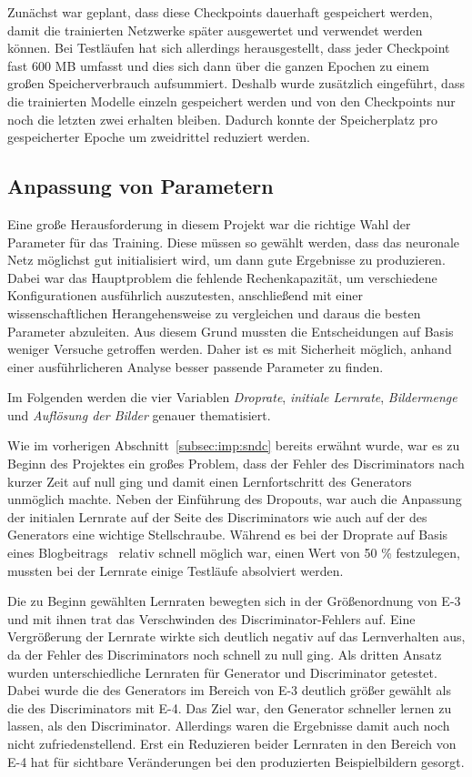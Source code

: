 Zunächst war geplant, dass diese Checkpoints dauerhaft gespeichert werden,
 damit die trainierten Netzwerke später ausgewertet und verwendet werden können.
 Bei Testläufen hat sich allerdings herausgestellt, dass jeder Checkpoint fast
 600 MB umfasst und dies sich dann über die ganzen Epochen zu einem großen
 Speicherverbrauch aufsummiert. Deshalb wurde zusätzlich eingeführt, dass die
 trainierten Modelle einzeln gespeichert werden und von den Checkpoints nur noch
 die letzten zwei erhalten bleiben. Dadurch konnte der Speicherplatz pro
 gespeicherter Epoche um zweidrittel reduziert werden.
 
 \subsection{Anpassung von Parametern} %
 
 Eine große Herausforderung in diesem Projekt war die richtige Wahl der
 Parameter für das Training. Diese müssen so gewählt werden, dass das neuronale Netz möglichst gut
 initialisiert wird, um dann gute Ergebnisse zu produzieren. Dabei war das
 Hauptproblem die fehlende Rechenkapazität, um verschiedene Konfigurationen
 ausführlich auszutesten, anschließend mit einer wissenschaftlichen
 Herangehensweise zu vergleichen und daraus die besten Parameter abzuleiten. Aus
 diesem Grund mussten die Entscheidungen auf Basis weniger Versuche getroffen
 werden. Daher ist es mit Sicherheit möglich, anhand einer ausführlicheren
 Analyse besser passende Parameter zu finden.
 
 Im Folgenden werden die vier Variablen \emph{Droprate}, \emph{initiale
 Lernrate}, \emph{Bildermenge} und \emph{Auflösung der Bilder} genauer
 thematisiert.
 
 Wie im vorherigen Abschnitt~\ref{subsec:imp:sndc} bereits erwähnt wurde, war es
 zu Beginn des Projektes ein großes Problem, dass der Fehler des Discriminators
 nach kurzer Zeit auf null ging und damit einen Lernfortschritt des Generators
 unmöglich machte. Neben der Einführung des Dropouts, war auch die Anpassung der
 initialen Lernrate auf der Seite des Discriminators wie auch auf der des
 Generators eine wichtige Stellschraube. Während es bei der Droprate auf Basis
 eines Blogbeitrags~\cite{brownlee2019} relativ schnell möglich war, einen Wert
 von 50 \% festzulegen, mussten bei der Lernrate einige Testläufe absolviert
 werden. 
 
 Die zu Beginn gewählten Lernraten bewegten sich in der Größenordnung von E-3
 und mit ihnen trat das Verschwinden des Discriminator-Fehlers auf. Eine
 Vergrößerung der Lernrate wirkte sich deutlich negativ auf das Lernverhalten
 aus, da der Fehler des Discriminators noch schnell zu null ging. Als dritten
 Ansatz wurden unterschiedliche Lernraten für Generator und Discriminator
 getestet. Dabei wurde die des Generators im Bereich von E-3 deutlich größer
 gewählt als die des Discriminators mit E-4. Das Ziel war, den Generator
 schneller lernen zu lassen, als den Discriminator. Allerdings waren die
 Ergebnisse damit auch noch nicht zufriedenstellend. Erst ein Reduzieren beider
 Lernraten in den Bereich von E-4 hat für sichtbare Veränderungen bei den
 produzierten Beispielbildern gesorgt.
 
